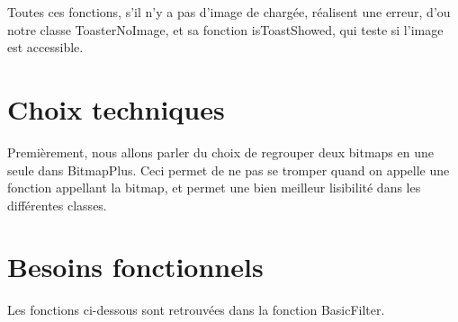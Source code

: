 \documentclass[12pt]{article}
\begin{document}
Toutes ces fonctions, s'il n'y a pas d'image de chargée, réalisent une erreur, d'ou notre classe ToasterNoImage, et sa fonction isToastShowed, qui teste si l'image est accessible.
 \\


\section{Choix techniques}

Premièrement, nous allons parler du choix de regrouper deux bitmaps en une seule dans BitmapPlus. Ceci permet de ne pas se tromper quand on appelle une fonction appellant la bitmap, et permet une bien meilleur lisibilité dans les différentes classes.



\section{Besoins fonctionnels}

Les fonctions ci-dessous sont retrouvées dans la fonction BasicFilter.
\end{document}
